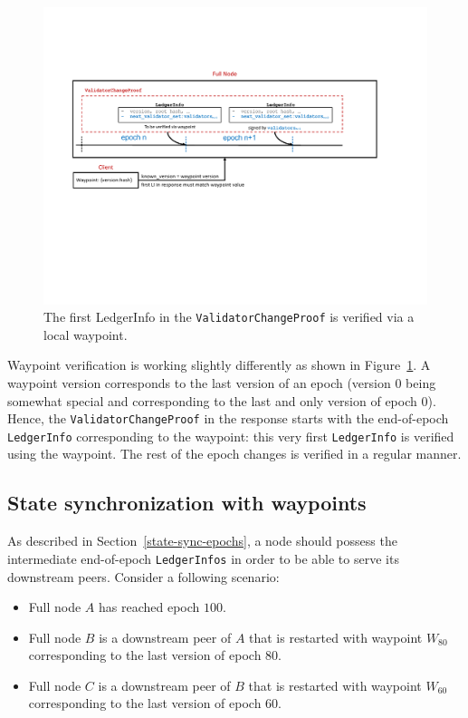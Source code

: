 \documentclass[letterpaper,10pt]{article}
\begin{document}
\begin{figure}[ht]
	\centering
	\includegraphics[width=\textwidth]{figures/waypoint-verification.pdf}
	\caption{\footnotesize{The first LedgerInfo in the \texttt{ValidatorChangeProof} is verified via a local waypoint.}}
	\label{fig:waypoint-verification}
\end{figure}

Waypoint verification is working slightly differently as shown in Figure~\ref{fig:waypoint-verification}.
A waypoint version corresponds to the last version of an epoch (version $0$ being somewhat special and corresponding to the last and only version of epoch $0$).
Hence, the \texttt{ValidatorChangeProof} in the response starts with the end-of-epoch \texttt{LedgerInfo} corresponding to the waypoint: this very first \texttt{LedgerInfo} is verified using the waypoint. The rest of the epoch changes is verified in a regular manner.

\subsection{State synchronization with waypoints}
\label{waypoint-state-sync}
As described in Section~\ref{state-sync-epochs}, a node should possess the intermediate end-of-epoch \texttt{LedgerInfos} in order to be able to serve its downstream peers.
Consider a following scenario:
\begin{itemize}
\item Full node $A$ has reached epoch $100$.
\item Full node $B$ is a downstream peer of $A$ that is restarted with waypoint $W_{80}$ corresponding to the last version of epoch $80$.
\item Full node $C$ is a downstream peer of $B$ that is restarted with waypoint $W_{60}$ corresponding to the last version of epoch $60$.
\end{itemize}
\end{document}
